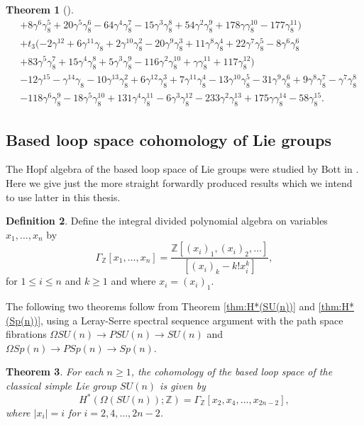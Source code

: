 \documentclass{article}
\theoremstyle{plain}
\newtheorem{thm}{Theorem}[section]
\theoremstyle{definition}
\newtheorem{defn}[thm]{Definition}
\numberwithin{thm}{section}
\begin{document}
\begin{thm}[\cite{nakagawaE8}]
\begin{align*}
					&+8\gamma^6\gamma_8^5+20\gamma^5\gamma_8^6-64\gamma^4\gamma_8^7-15\gamma^3\gamma_8^8 
					 +54\gamma^2\gamma_8^9+178\gamma\gamma_8^{10}-177\gamma_8^{11}) \\
					&+t_3(-2\gamma^{12}+6\gamma^{11}\gamma_8+2\gamma^{10}\gamma_8^2-20\gamma^9\gamma_8^3+11\gamma^8\gamma_8^4+22\gamma^7\gamma_8^5-8\gamma^6\gamma_8^6 \\
					&+83\gamma^5\gamma_8^7+15\gamma^4\gamma_8^8+5\gamma^3\gamma_8^9-116\gamma^2\gamma_8^{10}+\gamma\gamma_8^{11}+117\gamma_8^{12}) \\
					&-12\gamma^{15}-\gamma^{14}\gamma_8-10\gamma^{13}\gamma_8^2+6\gamma^{12}\gamma_8^3+7\gamma^{11}\gamma_8^4-13\gamma^{10}\gamma_8^5-31\gamma^9\gamma_8^6
					 +9\gamma^8\gamma_8^7-\gamma^7\gamma_8^8 \\
					&-118\gamma^6\gamma_8^9-18\gamma^5\gamma_8^{10}+131\gamma^4\gamma_8^{11}-6\gamma^3\gamma_8^{12}-233\gamma^2\gamma_8^{13}+175\gamma\gamma_8^{14}
					 -58\gamma_8^{15}.
			\end{align*}
		\end{thm}

	\subsection{Based loop space cohomology of Lie groups}\label{sec:LoopLie}
		
		The Hopf algebra of the based loop space of Lie groups were studied by Bott in \cite{bott1958}.
		Here we give just the more straight forwardly produced results which we intend to use latter in this thesis.
		
		\begin{defn}
			Define the integral divided polynomial algebra on variables $x_1,\dots,x_n$ by
			\begin{equation*}
				\Gamma_{\mathbb{Z}}[x_1,\dots,x_n]=\frac{\mathbb{Z}[(x_i)_1,(x_i)_2,\dots]}{[(x_i)_k-k!x_i^k]},
			\end{equation*}
			for $1\leq i \leq n$ and $k\geq 1$ and where $x_i=(x_i)_1$.
		\end{defn}
	
		The following two theorems follow from Theorem \ref{thm:H*(SU(n))} and \ref{thm:H*(Sp(n))},
		using a Leray-Serre spectral sequence argument with the path space fibrations $\Omega SU(n) \to PSU(n) \to SU(n)$ and $\Omega Sp(n) \to PSp(n) \to Sp(n)$.
		
		\begin{thm}\label{thm:LoopSU(n)}
			For each $n\geq 1$, the cohomology of the based loop space of the classical simple Lie group $SU(n)$ is given by
			\begin{equation*}
				H^*(\Omega(SU(n));\mathbb{Z})=\Gamma_{\mathbb{Z}}[x_2,x_4,\dots,x_{2n-2}],
			\end{equation*}
			where $|x_i|=i$ for $i=2,4,\dots,2n-2$.
		\end{thm}
		
\end{document}
